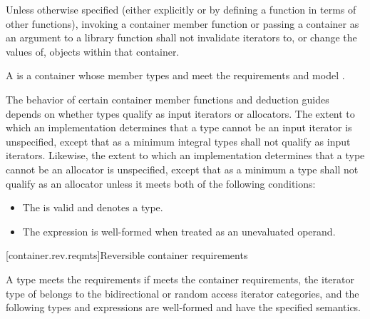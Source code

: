 \pnum
Unless otherwise specified (either explicitly or by defining a
function in terms of other functions), invoking a container member
function or passing a container as an argument to a library function
shall not invalidate iterators to, or change the values of, objects
within that container.

\pnum
A 
is a container
whose member types  and 
meet the
 requirements and
model .

\pnum
The behavior of certain container member functions and deduction guides
depends on whether types qualify as input iterators or allocators.
The extent to which an implementation determines that a type cannot be an input
iterator is unspecified, except that as a minimum integral types shall not qualify
as input iterators.
Likewise, the extent to which an implementation determines that a type cannot be
an allocator is unspecified, except that as a minimum a type  shall not qualify
as an allocator unless it meets both of the following conditions:

\begin{itemize}
\item The  
is valid and denotes a type.

\item The expression 
is well-formed when treated as an unevaluated operand.
\end{itemize}

[container.rev.reqmts]{Reversible container requirements}

\renewcommand{\indexcont}[1]{%
\indexlibrarymisc{\idxcode{#1}}{reversible containers}%
\indexlibrarymemberx{array}{#1}%
\indexlibrarymemberx{deque}{#1}%
\indexlibrarymemberx{list}{#1}%
\indexlibrarymemberx{vector}{#1}%
\indexlibrarymemberx{map}{#1}%
\indexlibrarymemberx{set}{#1}%
\indexlibrarymemberx{multiset}{#1}%
\indexlibrarymemberx{multimap}{#1}%
\indexlibrarymemberx{unordered_map}{#1}%
\indexlibrarymemberx{unordered_set}{#1}%
\indexlibrarymemberx{unordered_multiset}{#1}%
\indexlibrarymemberx{unordered_multimap}{#1}%
}

\pnum
A type  meets the  requirements if
 meets the container requirements,
the iterator type of  belongs to the
bidirectional or random access iterator categories,
and
the following types and expressions are well-formed and have
the specified semantics.

